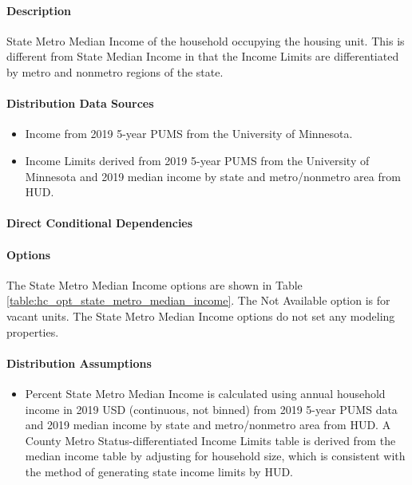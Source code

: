 \paragraph{Description}
% 
State Metro Median Income of the household occupying the housing unit.
This is different from State Median Income in that the Income Limits are
differentiated by metro and nonmetro regions of the state.

\paragraph{Distribution Data Sources}
% 
\begin{itemize}
\item
  Income from 2019 5-year PUMS from the University of Minnesota.
\item
  Income Limits derived from 2019 5-year PUMS from the University of Minnesota and 2019 median income by state and metro/nonmetro area from HUD.
\end{itemize}

\paragraph{Direct Conditional Dependencies}


\paragraph{Options}
The State Metro Median Income options are shown in Table \ref{table:hc_opt_state_metro_median_income}. The Not Available option is for vacant units. The State Metro Median Income options do not set any modeling properties.



\paragraph{Distribution Assumptions}
% 
\begin{itemize}
\item
  Percent State Metro Median Income is calculated using annual household
  income in 2019 USD (continuous, not binned) from 2019 5-year PUMS data
  and 2019 median income by state and metro/nonmetro area from HUD. A
  County Metro Status-differentiated Income Limits table is derived from
  the median income table by adjusting for household size, which is consistent with the method of generating state income limits by HUD.
\end{itemize}
